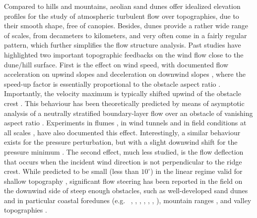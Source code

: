 Compared to hills and mountains, aeolian sand dunes offer idealized elevation profiles for the study of atmospheric turbulent flow over topographies, due to their smooth shape, free of canopies. Besides, dunes provide a rather wide range of scales, from decameters to kilometers, and very often come in a fairly regular pattern, which further simplifies the flow structure analysis. Past studies have highlighted two important topographic feedbacks on the wind flow close to the dune/hill surface. First is the effect on wind speed, with documented flow acceleration on upwind slopes \citep{Weaver2011} and deceleration on downwind slopes \citep{Baddock2007}, where the speed-up factor is essentially proportional to the obstacle aspect ratio \citep{Jackson1975}. Importantly, the velocity maximum is typically shifted upwind of the obstacle crest \citep{Jackson1975, Claudin2013}. This behaviour has been theoretically predicted by means of asymptotic analysis of a neutrally stratified boundary-layer flow over an obstacle of vanishing aspect ratio \citep{Jackson1975, Mason1979, Sykes1980, Hunt1988, Belcher1998, Kroy2002}. Experiments in flumes \citep{Zilker1977, Zilker1979, Frederick1988, Poggi2007, Bristow2022}, in wind tunnels \citep{Gong1989, Finnigan1990, Gong1996} and in field conditions at all scales \citep{Taylor1987a, Claudin2013, Fernando2019, Lu2021}, have also documented this effect. Interestingly, a similar behaviour exists for the pressure perturbation, but with a slight downwind shift for the pressure minimum \citep{Claudin2021}. The second effect, much less studied, is the flow deflection that occurs when the incident wind direction is not perpendicular to the ridge crest. While predicted to be small (less than $10^{\circ}$) in the linear regime valid for shallow topography \citep{Gadal2019}, significant flow steering has been reported in the field on the downwind side of steep enough obstacles, such as well-developed sand dunes \citep{Tsoar1983, Sweet1990, Walker2002, Smith2017} and in particular coastal foredunes (e.g.~ \citet{Hunter1983}, \citet{rasmussen1989}, \citet{Walker2006}, \citet{Walker2009}, \citet{Hesp2015}, \citet{Walker2017}, \citet{deWinter2020}), mountain ranges \citep{Kim2000, Lewis2008, Fernando2019}, and valley topographies \citep{Wiggs2002, Garvey2005}.

